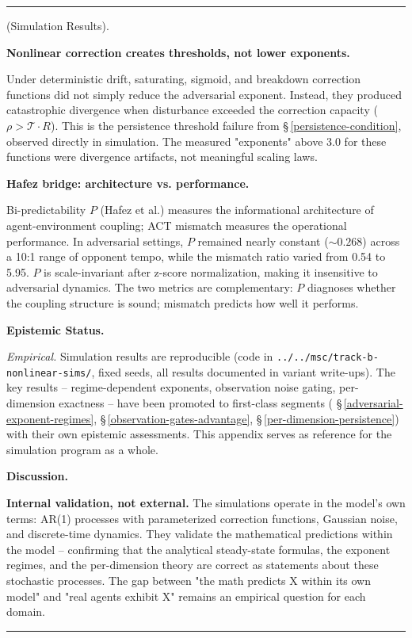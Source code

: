 \documentclass[11pt,oneside]{article}
\newcounter{claim}[section]
\renewcommand{\theclaim}{\thesection.\arabic{claim}}
\newenvironment{segment}[2]{%
  \refstepcounter{claim}%
  \bigskip\noindent\hrule\smallskip
  \noindent{\bfseries #1~\theclaim}\enskip(#2).\par\smallskip
  \noindent\ignorespaces
}{%
  \par\smallskip\noindent\hrule\bigskip
}
\newenvironment{detail}[1][]{\begin{segment}{Detail}{#1}}{\end{segment}}
\begin{document}
\begin{detail}[Simulation Results]
\medskip\noindent\textbf{Nonlinear correction creates thresholds, not lower exponents.}


Under deterministic drift, saturating, sigmoid, and breakdown correction functions did not simply reduce the adversarial exponent. Instead, they produced catastrophic divergence when disturbance exceeded the correction capacity ($\rho > \mathcal{T} \cdot R$). This is the persistence threshold failure from \S\,\ref{persistence-condition}, observed directly in simulation. The measured "exponents" above 3.0 for these functions were divergence artifacts, not meaningful scaling laws.


\medskip\noindent\textbf{Hafez bridge: architecture vs. performance.}


Bi-predictability $P$ (Hafez et al.) measures the informational architecture of agent-environment coupling; ACT mismatch measures the operational performance. In adversarial settings, $P$ remained nearly constant ($\sim 0.268$) across a 10:1 range of opponent tempo, while the mismatch ratio varied from 0.54 to 5.95. $P$ is scale-invariant after z-score normalization, making it insensitive to adversarial dynamics. The two metrics are complementary: $P$ diagnoses whether the coupling structure is sound; mismatch predicts how well it performs.


\medskip\noindent\textbf{Epistemic Status.}


\textit{Empirical.} Simulation results are reproducible (code in \texttt{../../msc/track-b-nonlinear-sims/}, fixed seeds, all results documented in variant write-ups). The key results -- regime-dependent exponents, observation noise gating, per-dimension exactness -- have been promoted to first-class segments ( \S\,\ref{adversarial-exponent-regimes}, \S\,\ref{observation-gates-advantage}, \S\,\ref{per-dimension-persistence}) with their own epistemic assessments. This appendix serves as reference for the simulation program as a whole.


\medskip\noindent\textbf{Discussion.}


\textbf{Internal validation, not external.} The simulations operate in the model's own terms: AR(1) processes with parameterized correction functions, Gaussian noise, and discrete-time dynamics. They validate the mathematical predictions within the model -- confirming that the analytical steady-state formulas, the exponent regimes, and the per-dimension theory are correct as statements about these stochastic processes. The gap between "the math predicts X within its own model" and "real agents exhibit X" remains an empirical question for each domain.


\end{detail}
\end{document}

